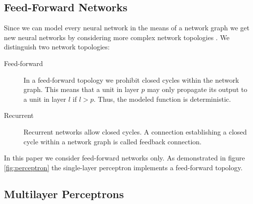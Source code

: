 \subsection{Feed-Forward Networks}


Since we can model every neural network in the means of a network graph we get new neural networks by considering more complex network topologies \cite[p.229-231]{Bishop:2006}. We distinguish two network topologies:
\begin{description}
\item[Feed-forward] In a feed-forward topology we prohibit closed cycles within the network graph. This means that a unit in layer $p$ may only propagate its output to a unit in layer $l$ if $l > p$. Thus, the modeled function is deterministic.
\item[Recurrent] Recurrent networks allow closed cycles. A connection establishing a closed cycle within a network graph is called feedback connection.
\end{description}
%
%
%
In this paper we consider feed-forward networks only. As demonstrated in figure \ref{fig:perceptron} the single-layer perceptron implements a feed-forward topology.

\subsection{Multilayer Perceptrons}
\label{subsec:multilayer-perceptron}

